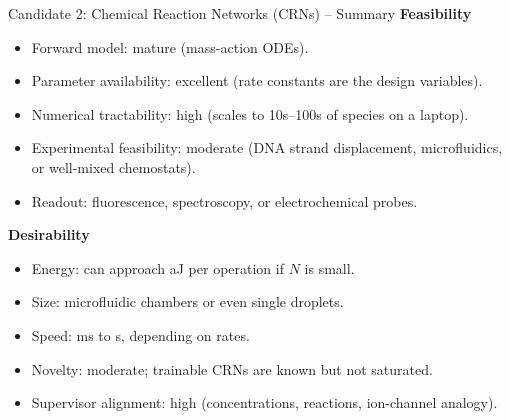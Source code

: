 \documentclass[aspectratio=169,11pt]{beamer}
\begin{document}
\begin{frame}{Candidate 2: Chemical Reaction Networks (CRNs) -- Summary}
  \small
  \textbf{Feasibility}
  \begin{itemize}
    \item Forward model: mature (mass-action ODEs).
    \item Parameter availability: excellent (rate constants are the design variables).
    \item Numerical tractability: high (scales to 10s--100s of species on a laptop).
    \item Experimental feasibility: moderate (DNA strand displacement, microfluidics, or well-mixed chemostats).
    \item Readout: fluorescence, spectroscopy, or electrochemical probes.
  \end{itemize}

  \vspace{0.1cm}
  \textbf{Desirability}
  \begin{itemize}
    \item Energy: can approach aJ per operation if $N$ is small.
    \item Size: microfluidic chambers or even single droplets.
    \item Speed: ms to s, depending on rates.
    \item Novelty: moderate; trainable CRNs are known but not saturated.
    \item Supervisor alignment: high (concentrations, reactions, ion-channel analogy).
  \end{itemize}
\end{frame}
\end{document}
